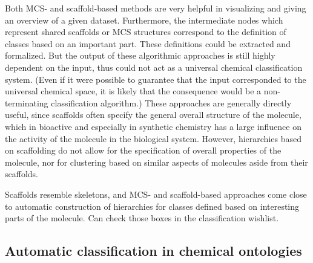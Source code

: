 \documentclass[10pt]{bmc_article}
\newenvironment{bmcformat}{\baselineskip20pt\sloppy\setboolean{publ}{false}}{\baselineskip20pt\sloppy}
\begin{document}
\begin{bmcformat}
Both MCS- and scaffold-based methods are very helpful in visualizing and giving an overview of a given dataset.  Furthermore, the intermediate nodes which represent shared scaffolds or MCS structures correspond to the definition of classes based on an important part.  These definitions could be extracted and formalized.  But the output of these algorithmic approaches is still highly dependent on the input, thus could not act as a universal chemical classification system. (Even if it were possible to guarantee that the input corresponded to the universal chemical space, it is likely that the consequence would be a non-terminating classification algorithm.)  These approaches are generally directly useful, since scaffolds often specify the general overall structure of the molecule, which in bioactive and especially in synthetic chemistry has a large influence on the activity of the molecule in the biological system.  However, hierarchies based on scaffolding do not allow for the specification of overall properties of the molecule, nor for clustering based on similar aspects of molecules aside from their scaffolds.  

Scaffolds resemble skeletons, and MCS- and scaffold-based approaches come close to automatic construction of hierarchies for classes defined based on interesting parts of the molecule.  Can check those boxes in the classification wishlist. 










\subsection*{Automatic classification in chemical ontologies}
\label{sec:resultschemontology}


\end{bmcformat}
\end{document}
